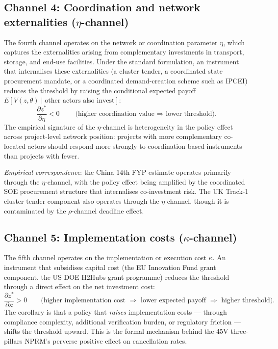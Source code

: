 \subsection{Channel 4: Coordination and network externalities ($\eta$-channel)}
\label{sec:ch3-channel-eta}

The fourth channel operates on the network or coordination parameter $\eta$, which captures the externalities arising from complementary investments in transport, storage, and end-use facilities. Under the standard \cite{pindyck1991irreversibility} formulation, an instrument that internalises these externalities (a cluster tender, a coordinated state procurement mandate, or a coordinated demand-creation scheme such as IPCEI) reduces the threshold by raising the conditional expected payoff $E[V(z, \theta) \mid \text{other actors also invest}]$:
\[
\frac{\partial z^*}{\partial \eta} < 0 \qquad \text{(higher coordination value $\Rightarrow$ lower threshold).}
\]
The empirical signature of the $\eta$-channel is heterogeneity in the policy effect across project-level network position: projects with more complementary co-located actors should respond more strongly to coordination-based instruments than projects with fewer.

\emph{Empirical correspondence}: the China 14th FYP estimate operates primarily through the $\eta$-channel, with the policy effect being amplified by the coordinated SOE procurement structure that internalises co-investment risk. The UK Track-1 cluster-tender component also operates through the $\eta$-channel, though it is contaminated by the $\rho$-channel deadline effect.

\subsection{Channel 5: Implementation costs ($\kappa$-channel)}
\label{sec:ch3-channel-kappa}

The fifth channel operates on the implementation or execution cost $\kappa$. An instrument that subsidises capital cost (the EU Innovation Fund grant component, the US DOE H2Hubs grant programme) reduces the threshold through a direct effect on the net investment cost:
\[
\frac{\partial z^*}{\partial \kappa} > 0 \qquad \text{(higher implementation cost $\Rightarrow$ lower expected payoff $\Rightarrow$ higher threshold).}
\]
The corollary is that a policy that \emph{raises} implementation costs --- through compliance complexity, additional verification burden, or regulatory friction --- shifts the threshold upward. This is the formal mechanism behind the 45V three-pillars NPRM's perverse positive effect on cancellation rates.

